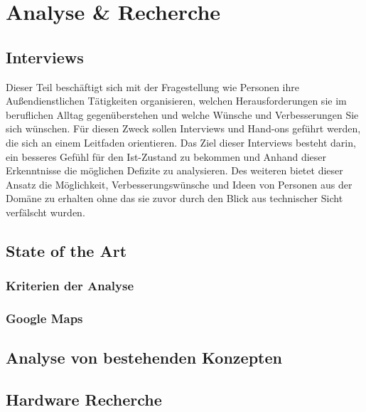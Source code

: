 \documentclass[../Bachelorarbeit.tex]{subfiles}
\begin{document}
\chapter{Analyse \& Recherche}
\label{chap:analyse}

\section{Interviews}
\label{chap:analyse:sec:interviews}
Dieser Teil beschäftigt sich mit der Fragestellung wie Personen ihre Außendienstlichen Tätigkeiten organisieren, welchen Herausforderungen sie im beruflichen Alltag gegenüberstehen und welche Wünsche und Verbesserungen Sie sich wünschen. 
Für diesen Zweck sollen Interviews und Hand-ons  geführt werden, die sich an einem Leitfaden orientieren. 
Das Ziel dieser Interviews besteht darin, ein besseres Gefühl für den Ist-Zustand zu bekommen und Anhand dieser Erkenntnisse die möglichen Defizite zu analysieren.
Des weiteren bietet dieser Ansatz die Möglichkeit, Verbesserungswünsche und Ideen von Personen aus der Domäne zu erhalten ohne das sie zuvor durch den Blick aus technischer Sicht verfälscht wurden.

\section{State of the Art}
\label{chap:analyse:sec:sota}


\subsection{Kriterien der Analyse}
\label{chap:analyse:sec:sota:sec:kriterien_der_analyse}


\subsection{Google Maps}
\label{chap:analyse:sec:sota:sec:google_maps}

\section{Analyse von bestehenden Konzepten}
\label{chap:analyse:sec:analyBestehendeKonz}

\section{Hardware Recherche}
\label{chap:analyse:sec:hw_recherce}

\end{document}

